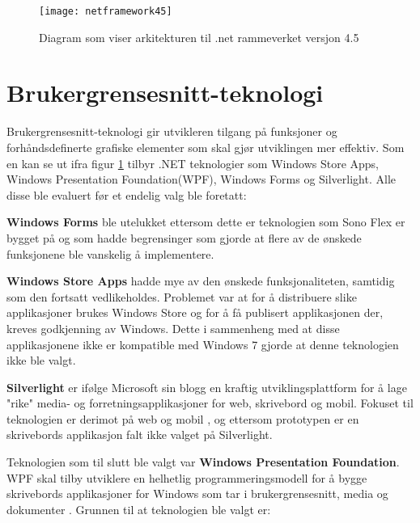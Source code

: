  
\begin{figure}[ht] 
\centering 
\texttt{[image: netframework45]} 
\caption{Diagram som viser arkitekturen til .net rammeverket versjon 4.5} 
\label{fig:net-arkitektur} 
\end{figure} 
 
 
\section{Brukergrensesnitt-teknologi} 

Brukergrensesnitt-teknologi gir utvikleren tilgang på funksjoner og forhåndsdefinerte grafiske elementer som skal gjør utviklingen mer effektiv. Som en kan se ut ifra figur \ref{fig:net-arkitektur} tilbyr .NET teknologier som Windows Store Apps, Windows Presentation Foundation(\gls{WPF}), Windows Forms og Silverlight. Alle disse ble evaluert før et endelig valg ble foretatt:

\textbf{Windows Forms} ble utelukket ettersom dette er teknologien som Sono Flex er bygget på og som hadde begrensinger som gjorde at flere av de ønskede funksjonene ble vanskelig å implementere. 

\textbf{Windows Store Apps} hadde mye av den ønskede funksjonaliteten, samtidig som den fortsatt vedlikeholdes. Problemet var at for å distribuere slike applikasjoner brukes Windows Store og for å få publisert applikasjonen der, kreves godkjenning av Windows. Dette i sammenheng med at disse applikasjonene ikke er kompatible med Windows 7\cite{Windo0:online} gjorde at denne teknologien ikke ble valgt. 

\textbf{Silverlight} er ifølge Microsoft sin blogg\cite{User1111:online} en kraftig utviklingsplattform for å lage "rike" media- og forretningsapplikasjoner for web, skrivebord og mobil. Fokuset til teknologien er derimot på web og mobil \cite{Micro6:online}, og ettersom prototypen er en skrivebords applikasjon falt ikke valget på Silverlight.

Teknologien som til slutt ble valgt var \textbf{Windows Presentation Foundation}. WPF skal tilby utviklere en helhetlig programmeringsmodell for å bygge skrivebords applikasjoner for Windows som tar i brukergrensesnitt, media og dokumenter \cite{Windo777:online}. Grunnen til at teknologien ble valgt er:


